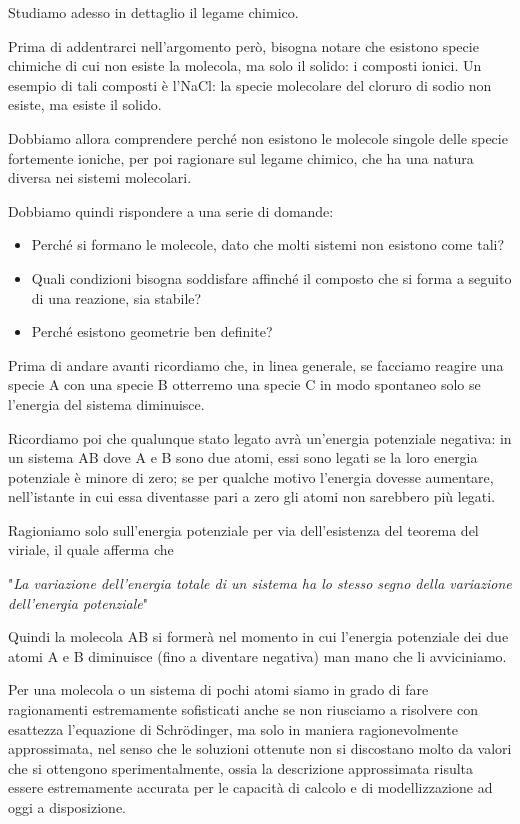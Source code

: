 Studiamo adesso in dettaglio il legame chimico.

Prima di addentrarci nell'argomento però, bisogna notare che esistono specie chimiche di cui non esiste la molecola, ma solo il solido: i composti ionici. Un esempio di tali composti è l'NaCl: la specie molecolare del cloruro di sodio non esiste, ma esiste il solido.

Dobbiamo allora comprendere perché non esistono le molecole singole delle specie fortemente ioniche, per poi ragionare sul legame chimico, che ha una natura diversa nei sistemi molecolari.

Dobbiamo quindi rispondere a una serie di domande:
\begin{itemize}
    \item Perché si formano le molecole, dato che molti sistemi non esistono come tali?
    \item Quali condizioni bisogna soddisfare affinché il composto che si forma a seguito di una reazione, sia stabile?
    \item Perché esistono geometrie ben definite?
\end{itemize}
Prima di andare avanti ricordiamo che, in linea generale, se facciamo reagire una specie A con una specie B otterremo una specie C in modo spontaneo solo se l'energia del sistema diminuisce. 

Ricordiamo poi che qualunque stato legato avrà un'energia potenziale negativa: in un sistema AB dove A e B sono due atomi, essi sono legati se la loro energia potenziale è minore di zero; se per qualche motivo l'energia dovesse aumentare, nell'istante in cui essa diventasse pari a zero gli atomi non sarebbero più legati.

Ragioniamo solo sull'energia potenziale per via dell'esistenza del teorema del viriale, il quale afferma che

\vspace{0.2cm}"\textit{La variazione dell'energia totale di un sistema ha lo stesso segno della variazione dell'energia potenziale}"

\vspace{0.2cm}Quindi la molecola AB si formerà nel momento in cui l'energia potenziale dei due atomi A e B diminuisce (fino a diventare negativa) man mano che li avviciniamo.

\vspace{0.2cm}Per una molecola o un sistema di pochi atomi siamo in grado di fare ragionamenti estremamente sofisticati anche se non riusciamo a risolvere con esattezza l'equazione di Schrödinger, ma solo in maniera ragionevolmente approssimata, nel senso che le soluzioni ottenute non si discostano molto da valori che si ottengono sperimentalmente, ossia la descrizione approssimata risulta essere estremamente accurata per le capacità di calcolo e di modellizzazione ad oggi a disposizione.

